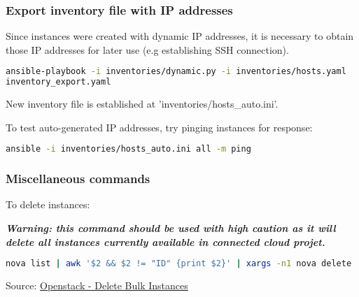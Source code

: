 \subsubsection{Export inventory file with IP addresses}
Since instances were created with dynamic IP addresses, it is necessary to obtain those IP addresses for later use
(e.g establishing SSH connection).  
\begin{lstlisting}[language=bash]
ansible-playbook -i inventories/dynamic.py -i inventories/hosts.yaml
inventory_export.yaml
\end{lstlisting}
New inventory file is established at 'inventories/hosts\_auto.ini'.  

To test auto-generated IP addresses, try pinging instances for response:  
\begin{lstlisting}[language=bash]
ansible -i inventories/hosts_auto.ini all -m ping
\end{lstlisting}

\subsubsection{Miscellaneous commands}
To delete instances:  

\textit{\textbf{Warning: this command should be used with high caution as it will delete all instances currently available in connected cloud projet.}}  
\begin{lstlisting}[language=bash]
nova list | awk '$2 && $2 != "ID" {print $2}' | xargs -n1 nova delete
\end{lstlisting}
Source: \href{https://maestropandy.wordpress.com/2016/08/24/openstack-delete-bulk-instances/}{Openstack - Delete Bulk Instances}  





